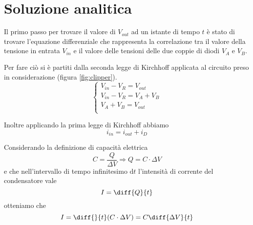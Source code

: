 \chapter{Soluzione analitica}
	Il primo passo per trovare il valore di $V_{out}$ ad un istante di tempo $t$ è stato di trovare l'equazione differenziale che rappresenta la correlazione tra il valore della tensione in entrata $V_{in}$ e il valore delle tensioni delle due coppie di diodi $V_{A}$ e $V_{B}$.
	
	Per fare ciò si è partiti dalla seconda legge di Kirchhoff applicata al circuito preso in considerazione (figura \ref{fig:clipper}).
	\[
	\begin{cases}
		V_{in}-V_{R} = V_{out}\\
		V_{in}-V_{R} = V_{A}+V_{B}\\
		V_{A}+V_{B} = V_{out}\\
	\end{cases}
	\]
	
	Inoltre applicando la prima legge di Kirchhoff abbiamo
	\[
		i_{in} = i_{out}+i_{D}
	\]
	
	Considerando la definizione di capacità elettrica
	\[
		C = \frac{Q}{\Delta V} \Rightarrow Q = C \cdot \Delta V
	\]
	e che nell'intervallo di tempo infinitesimo $\mathrm{d}t$ l'intensità di corrente del condensatore vale 
	\[
		I = \diff{Q}{t}
	\]
	otteniamo che
	\[
		I = \diff{}{t}(C \cdot \Delta V) = C\diff{\Delta V}{t}
	\]
	\pagebreak
		
